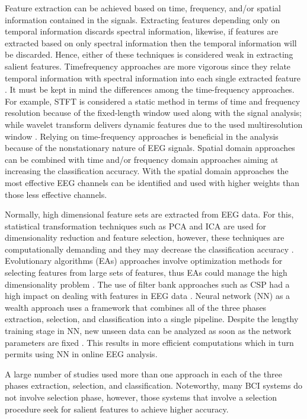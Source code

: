 \documentclass[journal,twocolumn]{IEEEtran}
\begin{document}
Feature extraction can be achieved based on time, frequency, and/or spatial information contained in the signals. Extracting features depending only on temporal information discards spectral information, likewise, if features are extracted based on only spectral information then the temporal information will be discarded. Hence, either of these techniques is considered weak in extracting salient features. Timefrequency approaches are more vigorous since they relate temporal information with spectral information into each single extracted feature \cite{lee2019application}. It must be kept in mind the differences among the time-frequency approaches. For example, STFT is considered a static method in terms of time and frequency resolution because of the fixed-length window used along with the signal analysis; while wavelet transform delivers dynamic features due to the used multiresolution window \cite{herff2020potential}. Relying on time-frequency approaches is beneficial in the analysis because of the nonstationary nature of EEG signals. Spatial domain approaches can be combined with time and/or frequency domain approaches aiming at increasing the classification accuracy. With the spatial domain approaches the most effective EEG channels can be identified \cite{yilmaz2020diversity} and used with higher weights than those less effective channels.

Normally, high dimensional feature sets are extracted from EEG data. For this, statistical transformation techniques such as PCA and ICA are used for dimensionality reduction and feature selection, however, these techniques are computationally demanding and they may decrease the classification accuracy \cite{lu2016deep}. Evolutionary algorithms (EAs) approaches involve optimization methods for selecting features from large sets of features, thus EAs could manage the high dimensionality problem \cite{tan2020dimensionality}. The use of filter bank approaches such as CSP had a high impact on dealing with features in EEG data \cite{padfield2019eeg}. Neural network (NN) as a wealth approach uses a framework that combines all of the three phases extraction, selection, and classification into a single pipeline. Despite the lengthy training stage in NN, new unseen data can be analyzed as soon as the network parameters are fixed \cite{wang2018lstm}. This results in more efficient computations which in turn permits using NN in online EEG analysis.

A large number of studies \cite{baig2017differential, kevric2017comparison, dai2019eeg, kumar2017improved, zhang2019novel} used more than one approach in each of the three phases extraction, selection, and classification. Noteworthy, many BCI systems do not involve selection phase, however, those systems that involve a selection procedure seek for salient features to achieve higher accuracy.
\end{document}
